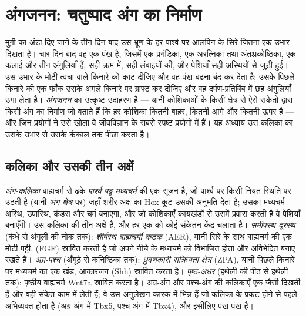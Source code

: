 \chapter{अंगजनन: चतुष्पाद अंग का निर्माण}\label{ch:b2:limb-organogenesis}

मुर्ग़ी का अंडा दिए जाने के तीन दिन बाद उस भ्रूण के हर पार्श्व पर
आलपिन के सिरे जितना एक उभार दिखता है। चार दिन बाद वह एक पंख है, जिसमें
एक प्रगंडिका, एक अरत्निका तथा अंतःप्रकोष्ठिका, एक कलाई और तीन अंगुलियाँ
हैं, सही क्रम में, सही लंबाइयों की, और पेशियाँ सही अस्थियों से जुड़ी हुई।
उस उभार के मोटी त्वचा वाले किनारे को काट दीजिए और वह पंख बढ़ना बंद कर
देता है; उसके पिछले किनारे की एक फाँक उसके अगले किनारे पर ग्राफ़्ट कर
दीजिए और वह दर्पण-प्रतिबिंब में छह अंगुलियाँ उगा लेता है। 
\emph{अंगजनन} का उत्कृष्ट उदाहरण है --- यानी कोशिकाओं के किसी क्षेत्र से
ऐसे संकेतों द्वारा किसी अंग का निर्माण जो बताते हैं कि हर कोशिका कितनी
बाहर, कितनी आगे और कितनी ऊपर है --- और जिन प्रयोगों ने उसे खोला वे
जीवविज्ञान के सबसे स्पष्ट प्रयोगों में हैं। यह अध्याय उस कलिका का उसके
उभार से उसके कंकाल तक पीछा करता है।

\section{कलिका और उसकी तीन अक्षें}

\begin{definition}[अंग-कलिका]\label{def:b2:limb-organogenesis:bud}
\emph{अंग-कलिका} बाह्यचर्म से ढके \emph{पार्श्व पट्ट मध्यचर्म} की एक
सूजन है, जो पार्श्व पर किसी नियत स्थिति पर उठती है
(यानी \emph{अंग-क्षेत्र} पर) जहाँ शरीर-अक्ष का Hox कूट उसकी अनुमति देता
है; उसका मध्यचर्म अस्थि, उपास्थि, कंडरा और चर्म बनाएगा, और जो
कोशिकाएँ कायखंडों से उसमें प्रवास करती हैं वे पेशियाँ बनाएँगी।
उस कलिका की तीन अक्षें हैं, और हर एक को कोई संकेतन-केंद्र चलाता है।
\emph{समीपस्थ-दूरस्थ} (कंधे से अंगुली की नोक तक): \emph{शीर्षस्थ
बाह्यचर्मी कटक} (AER), यानी सिरे के साथ बाह्यचर्म की एक मोटी पट्टी,
 (FGF) स्रावित करती है जो अपने नीचे के
मध्यचर्म को विभाजित होता और अविभेदित बनाए रखते हैं।
\emph{अग्र-पश्च} (अँगूठे से कनिष्ठिका तक): \emph{ध्रुवणकारी
सक्रियता क्षेत्र} (ZPA), यानी पिछले किनारे पर मध्यचर्म का एक खंड,
आकारजन \emph{} (Shh) स्रावित करता है।
\emph{पृष्ठ-अधर} (हथेली की पीठ से हथेली तक): पृष्ठीय
बाह्यचर्म Wnt7a स्रावित करता है। अग्र-अंग और पश्च-अंग की कलिकाएँ एक जैसी
दिखती हैं और वही संकेत काम में लेती हैं; वे उस अनुलेखन कारक में भिन्न हैं
जो कलिका के प्रकट होने से पहले अभिव्यक्त होता है (अग्र-अंग में Tbx5,
पश्च-अंग में Tbx4), और इसीलिए पंख पंख है।
\end{definition}

